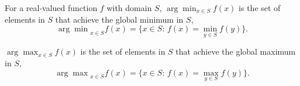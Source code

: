 \documentclass[12pt]{article}
\begin{document}
For a real-valued function $f$ with domain $S$, $\arg \min_{x \in S} f(x)$ is the set of elements in $S$ that achieve the global minimum in $S$,
\[
 {\arg \min}_{x \in S} f(x) = \{ x \in S :\, f(x) = \min_{y\in S} f(y) \}.
\]

$\arg \max_{x \in S} f(x)$ is the set of elements in $S$ that achieve the global maximum in $S$,
\[
 {\arg \max}_{x \in S} f(x) = \{ x \in S :\, f(x) = \max_{y\in S} f(y) \}.
\]



\end{document}
